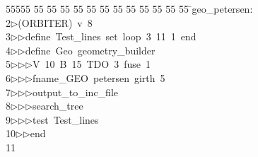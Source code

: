 %
%
\begin{tabbing}
55555 \= 55 \= 55 \= 55 \= 55 \= 55 \= 55 \= 55 \= 55 \= 55 \= 55 \= 55 \= 55 \= \>geo\_petersen:\\[0pt]
2\>$\triangleright$\>(ORBITER)\ v\ 8\ \\[0pt]
3\>$\triangleright$\>$\triangleright$\>define\ Test\_lines\ set\ loop\ 3\ 11\ 1\ end\ \\[0pt]
4\>$\triangleright$\>$\triangleright$\>define\ Geo\ geometry\_builder\ \\[0pt]
5\>$\triangleright$\>$\triangleright$\>$\triangleright$\>V\ 10\ B\ 15\ TDO\ 3\ fuse\ 1\ \\[0pt]
6\>$\triangleright$\>$\triangleright$\>$\triangleright$\>fname\_GEO\ petersen\ girth\ 5\ \\[0pt]
7\>$\triangleright$\>$\triangleright$\>$\triangleright$\>output\_to\_inc\_file\ \\[0pt]
8\>$\triangleright$\>$\triangleright$\>$\triangleright$\>search\_tree\ \\[0pt]
9\>$\triangleright$\>$\triangleright$\>$\triangleright$\>test\ Test\_lines\ \\[0pt]
10\>$\triangleright$\>$\triangleright$\>end\\[0pt]
11\>\end{tabbing}
